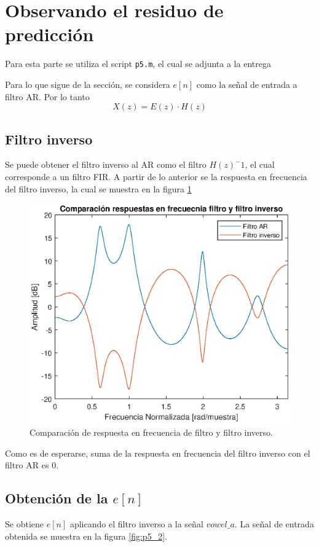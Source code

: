 \section{Observando el residuo de predicción}

Para esta parte se utiliza el script \texttt{p5.m}, el cual se adjunta a la entrega

Para lo que sigue de la sección, se considera $e[n]$ como la señal de entrada a filtro AR. Por lo tanto
$$ X(z) = E(z)\cdot H(z)$$
\subsection{Filtro inverso}
Se puede obtener el filtro inverso al AR como el filtro $H(z)^-1$, el cual corresponde a un filtro FIR. A partir de lo anterior se la respuesta en frecuencia del filtro inverso, la cual se muestra en la figura \ref{fig:p5_1}

\begin{figure}[H]
    \centering
    \includegraphics[width = .8\linewidth]{figures/p5_1filtinv.eps}
    \caption{Comparación de respuesta en frecuencia de filtro y filtro inverso.}
    \label{fig:p5_1}
\end{figure}

Como es de esperarse, suma de la respuesta en frecuencia del filtro inverso con el filtro AR es 0.
\subsection{Obtención de la $e[n]$}

Se obtiene $e[n]$ aplicando el filtro inverso a la señal $vowel\_a$. La señal de entrada obtenida se muestra en la figura \ref{fig:p5_2}.

